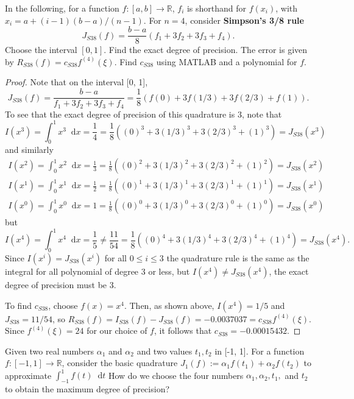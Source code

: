 \documentclass[12pt]{article}
\theoremstyle{definition}
\newenvironment{custompbm}[1]
  {\renewcommand\theproblem{#1}\problem}
  {\endproblem}
\newcommand*\diff{\mathop{}\!\mathrm{d}}
\begin{document}
\begin{custompbm}{9.3.1}
  In the following, for a function $f: [a,b] \to \mathbb{R}$, $f_i$ is shorthand
  for $f(x_i)$, with $x_i = a + (i-1)(b-a)/(n-1)$. For $n=4$, consider \textbf{Simpson's 3/8 rule}
  \[
    J_{S38}(f) = \frac{b-a}{8}(f_1 + 3f_2 + 3f_3 + f_4).
  \]
  Choose the interval $[0,1]$. Find the exact degree of precision. The error is
  given by $R_{S38}(f) = c_{S38} f^{(4)}(\xi)$. Find $c_{S38}$ using MATLAB and a
  polynomial for $f$.
\end{custompbm}

\begin{proof}
  Note that on the interval [0, 1],
  \[
    J_{S38}(f) = \frac{b-a}{f_1 + 3f_2 + 3f_3 + f_4} = \frac{1}{8}(f(0) + 3f(1/3) + 3f(2/3) + f(1)).
  \]
  To see that the exact degree of precision of this
  quadrature is 3, note that
  \[
      I(x^3) = \int_0^1 x^3 \diff{x} = \frac{1}{4} = \frac{1}{8}\left((0)^3 + 3 (1/3)^3 + 3 (2/3)^3 + (1)^3\right) = J_{S38}(x^3)
  \]
  and similarly
  \begin{align*}
      I(x^2) = \int_0^1 x^2 \diff{x} = \frac{1}{3} = \frac{1}{8}\left((0)^2 + 3 (1/3)^2 + 3 (2/3)^2 + (1)^2\right) = J_{S38}(x^2) \\
      I(x^1) = \int_0^1 x^1 \diff{x} = \frac{1}{2} = \frac{1}{8}\left((0)^1 + 3 (1/3)^1 + 3 (2/3)^1 + (1)^1\right) = J_{S38}(x^1) \\
      I(x^0) = \int_0^1 x^0 \diff{x} = 1 = \frac{1}{8}\left((0)^0 + 3 (1/3)^0 + 3 (2/3)^0 + (1)^0\right) = J_{S38}(x^0)
  \end{align*}
  but
  \[
    I(x^4) = \int_0^1 x^4 \diff{x} = \frac{1}{5} \neq \frac{11}{54} = \frac{1}{8}\left((0)^4 + 3 (1/3)^4 + 3 (2/3)^4 + (1)^4\right) = J_{S38}(x^4).
  \]
  Since $I(x^i) = J_{S38}(x^i)$ for all $0 \leq i \leq 3$ the quadrature rule is
  the same as the integral for all polynomial of degree 3 or less, but $I(x^4) \neq J_{S38}(x^4)$,
  the exact degree of precision must be 3.

  To find $c_{S38}$, choose $f(x) = x^4$. Then, as shown above, $I(x^4) = 1/5$ and $J_{S38} = 11/54$,
  so $R_{S38}(f) = I_{S38}(f) - J_{S38}(f) = -0.0037037 = c_{S38} f^{(4)}(\xi)$. Since
  $f^{(4)}(\xi) = 24$ for our choice of $f$, it follows that $c_{S38} = -0.00015432$.
\end{proof}


\begin{custompbm}{9.4.1}
  Given two real numbers $\alpha_1$ and $\alpha_2$ and two values $t_1, t_2$ in
  [-1, 1]. For a function $f: [-1,1] \to \mathbb{R}$, consider the basic quadrature
  $J_1(f):= \alpha_1 f(t_1) + \alpha_2 f(t_2)$ to approximate $\int_{-1}^{1} f(t) \diff{t}$
  How do we choose the four numbers $\alpha_1, \alpha_2, t_1,$ and $t_2$ to obtain
  the maximum degree of precision?
\end{custompbm}
\end{document}
